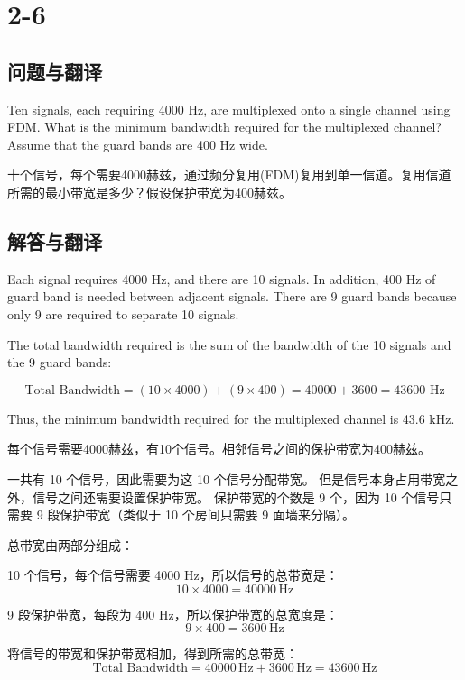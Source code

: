 \section{2-6}

\subsection{问题与翻译}

Ten signals, each requiring 4000 Hz, are multiplexed onto a single channel using FDM. What is the minimum bandwidth required for the multiplexed channel? Assume that the guard bands are 400 Hz wide.

十个信号，每个需要4000赫兹，通过频分复用(FDM)复用到单一信道。复用信道所需的最小带宽是多少？假设保护带宽为400赫兹。

\subsection{解答与翻译}

Each signal requires 4000 Hz, and there are 10 signals. In addition, 400 Hz of guard band is needed between adjacent signals. There are 9 guard bands because only 9 are required to separate 10 signals.

The total bandwidth required is the sum of the bandwidth of the 10 signals and the 9 guard bands:

\[
\text{Total Bandwidth} = (10 \times 4000) + (9 \times 400) = 40000 + 3600 = 43600 \text{ Hz}
\]

Thus, the minimum bandwidth required for the multiplexed channel is 43.6 kHz.

\vspace{10pt}

每个信号需要4000赫兹，有10个信号。相邻信号之间的保护带宽为400赫兹。

一共有 10 个信号，因此需要为这 10 个信号分配带宽。
但是信号本身占用带宽之外，信号之间还需要设置保护带宽。
保护带宽的个数是 9 个，因为 10 个信号只需要 9 段保护带宽（类似于 10 个房间只需要 9 面墙来分隔）。

总带宽由两部分组成：

10 个信号，每个信号需要 4000 Hz，所以信号的总带宽是：
\[
10 \times 4000 = 40000 \, \text{Hz}
\]

9 段保护带宽，每段为 400 Hz，所以保护带宽的总宽度是：
\[
9 \times 400 = 3600 \, \text{Hz}
\]

将信号的带宽和保护带宽相加，得到所需的总带宽：
\[
\text{Total Bandwidth} = 40000 \, \text{Hz} + 3600 \, \text{Hz} = 43600 \, \text{Hz}
\]

